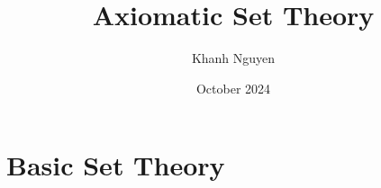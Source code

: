 \documentclass[12pt]{article}
\title{Axiomatic Set Theory}
\author{Khanh Nguyen}
\date{October 2024}
\begin{document}
\maketitle
\tableofcontents
\clearpage

\section{Basic Set Theory}

\end{document}
